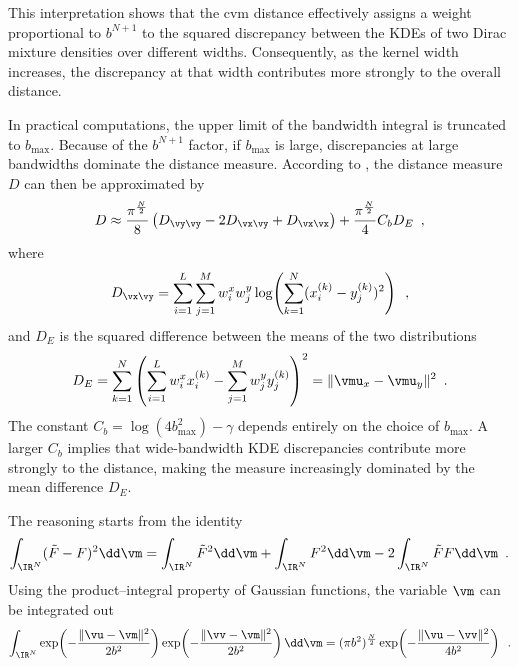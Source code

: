 This interpretation shows that the \ac{cvm} distance effectively assigns a weight proportional to $b^{N+1}$ to the squared discrepancy between the KDEs of two Dirac mixture densities over different widths. Consequently, as the kernel width increases, the discrepancy at that width contributes more strongly to the overall distance.

In practical computations, the upper limit of the bandwidth integral is truncated to $b_{\max}$. Because of the $b^{N+1}$ factor, if $b_{\max}$ is large, discrepancies at large bandwidths dominate the distance measure. According to \cite[Theorem~4.2]{OPTREDUC}, the distance measure $D$ can then be approximated by
\begin{equation}
	D \approx \frac{\pi^{\frac{N}{2}}}{8} \left( D_{\vy\vy} - 2D_{\vx\vy} + D_{\vx\vx} \right) + \frac{\pi^{\frac{N}{2}}}{4} C_b D_E \enspace,
	\label{eq:CVM_Distance}
\end{equation}
where
\begin{equation}
	D_{\vx\vy} = \sum_{i=1}^L \sum_{j=1}^M w_i^x w_j^y \log\!\left( \sum_{k=1}^N (x_i^{(k)} - y_j^{(k)})^2 \right) \enspace,
	\label{eq:CVM_Dxy}
\end{equation}
and $D_E$ is the squared difference between the means of the two distributions
\begin{equation}
	D_E = \sum_{k=1}^N \left( \sum_{i=1}^L w_i^x x_i^{(k)} - \sum_{j=1}^M w_j^y y_j^{(k)} \right)^2 = \|\vmu_x - \vmu_y\|^2 \enspace.
	\label{eq:CVM_DE}
\end{equation}
The constant $C_b = \log(4b_{\max}^2) - \gamma$ depends entirely on the choice of $b_{\max}$. A larger $C_b$ implies that wide-bandwidth KDE discrepancies contribute more strongly to the distance, making the measure increasingly dominated by the mean difference $D_E$.

The reasoning starts from the identity
\begin{equation}
	\int_{\IR^N} (\tilde{F} - F)^2 \dd\vm = \int_{\IR^N} \tilde{F}^2 \dd\vm + \int_{\IR^N} F^2 \dd\vm - 2\int_{\IR^N} \tilde{F}F \dd\vm \enspace.
    \label{eq:original_integral}
\end{equation}
Using the product--integral property of Gaussian functions, the variable $\vm$ can be integrated out
\begin{equation}
	\int_{\IR^N} \exp\!\left(-\frac{\|\vu - \vm\|^2}{2b^2}\right) \exp\!\left(-\frac{\|\vv - \vm\|^2}{2b^2}\right) \dd\vm = (\pi b^2)^{\frac{N}{2}} \exp\!\left(-\frac{\|\vu - \vv\|^2}{4b^2}\right) \enspace.
\end{equation}

